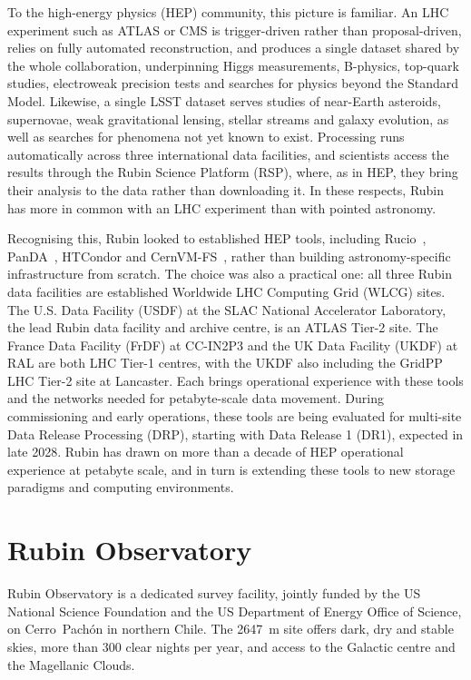 To the high-energy physics (HEP) community, this picture is familiar.
An LHC experiment such as ATLAS or CMS is trigger-driven rather than proposal-driven, relies on fully automated reconstruction, and produces a single dataset shared by the whole collaboration, underpinning Higgs measurements, B-physics, top-quark studies, electroweak precision tests and searches for physics beyond the Standard Model.
Likewise, a single LSST dataset serves studies of near-Earth asteroids, supernovae, weak gravitational lensing, stellar streams and galaxy evolution, as well as searches for phenomena not yet known to exist.
Processing runs automatically across three international data facilities, and scientists access the results through the Rubin Science Platform (RSP), where, as in HEP, they bring their analysis to the data rather than downloading it.
In these respects, Rubin has more in common with an LHC experiment than with pointed astronomy.

Recognising this, Rubin looked to established HEP tools, including Rucio~\cite[][]{2019CSBS....3...11B}, PanDA~\cite{2024EPJWC.29504026K}, HTCondor and CernVM-FS~\cite{2011JPhCS.331d2003B}, rather than building astronomy-specific infrastructure from scratch.
The choice was also a practical one: all three Rubin data facilities are established Worldwide LHC Computing Grid (WLCG) sites.
The U.S. Data Facility (USDF) at the SLAC National Accelerator Laboratory, the lead Rubin data facility and archive centre, is an ATLAS Tier-2 site.
The France Data Facility (FrDF) at CC-IN2P3 and the UK Data Facility (UKDF) at RAL are both LHC Tier-1 centres, with the UKDF also including the GridPP LHC Tier-2 site at Lancaster.
Each brings operational experience with these tools and the networks needed for petabyte-scale data movement.
During commissioning and early operations, these tools are being evaluated for multi-site Data Release Processing (DRP), starting with Data Release 1 (DR1), expected in late 2028.
Rubin has drawn on more than a decade of HEP operational experience at petabyte scale, and in turn is extending these tools to new storage paradigms and computing environments.

\section{Rubin Observatory}
\label{sec:rubin_obs}

Rubin Observatory is a dedicated survey facility, jointly funded by the US National Science Foundation and the US Department of Energy Office of Science, on Cerro~Pach\'{o}n in northern Chile.
The 2647~m site offers dark, dry and stable skies, more than 300 clear nights per year, and access to the Galactic centre and the Magellanic Clouds.

